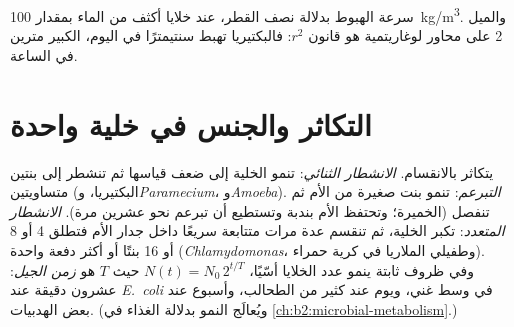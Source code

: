 \begin{omfigure}

{\small سرعة الهبوط  بدلالة نصف القطر، عند خلايا أكثف
من الماء بمقدار \qty{100}{kg/m^3}. والميل 2 على محاور لوغاريتمية هو
قانون $r^2$: فالبكتيريا تهبط سنتيمترًا في اليوم،  الكبير
مترين في الساعة.}
\end{omfigure}

\section{التكاثر والجنس في خلية واحدة}

\begin{definition}\label{def:b2:unicellular-diversity:division}
يتكاثر  بالانقسام. \emph{الانشطار الثنائي}: تنمو
الخلية إلى ضعف قياسها ثم تنشطر إلى بنتين متساويتين (البكتيريا،
و\emph{Paramecium}، و\emph{Amoeba}). \emph{التبرعم}: تنمو بنت
صغيرة من الأم ثم تنفصل (الخميرة؛ وتحتفظ الأم بندبة وتستطيع أن
تبرعم نحو عشرين مرة). \emph{الانشطار المتعدد}: تكبر الخلية، ثم
تنقسم عدة مرات متتابعة سريعًا داخل جدار الأم فتطلق 4 أو 8 أو 16
بنتًا أو أكثر دفعة واحدة (\emph{Chlamydomonas}، وطفيلي الملاريا في
كرية حمراء). وفي ظروف ثابتة ينمو عدد الخلايا أسّيًا،
$N(t) = N_0\,2^{t/T}$ حيث $T$ هو \emph{زمن الجيل}:
عشرون دقيقة عند \emph{E.~coli} في وسط غني، ويوم عند كثير
من الطحالب، وأسبوع عند بعض الهدبيات. (ويُعالَج النمو بدلالة الغذاء
في \cref{ch:b2:microbial-metabolism}.)
\end{definition}

